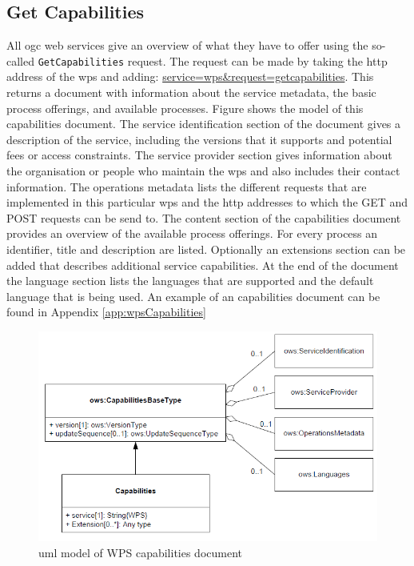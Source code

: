 \subsection{Get Capabilities}
All \ac{ogc} web services give an overview of what they have to offer using the so-called \texttt{GetCapabilities} request. The request can be made by taking the \ac{http} address of the \ac{wps} and adding: \url{service=wps&request=getcapabilities}. This returns a document with information about the service metadata, the basic process offerings, and available processes. Figure \label{fig:WPSmodel2} shows the model of this capabilities document. The service identification section of the document gives a description of the service, including the versions that it supports and potential fees or access constraints. The service provider section gives information about the organisation or people who maintain the \ac{wps} and also includes their contact information. The operations metadata lists the different requests that are implemented in this particular \ac{wps} and the \ac{http} addresses to which the GET and POST requests can be send to. The content section of the capabilities document provides an overview of the available process offerings. For every process an identifier, title and description are listed. Optionally an extensions section can be added that describes additional service capabilities. At the end of the document the language section lists the languages that are supported and the default language that is being used. An example of an capabilities document can be found in Appendix \ref{app:wpsCapabilities}  

\begin{figure}
	\centering
	\includegraphics[width=1\linewidth]{UML/WPSmodel2.png}
	\caption{\ac{uml} model of WPS capabilities document \citep[p. 70]{GEO:OGC}}
	\label{fig:WPSmodel2}
\end{figure}

